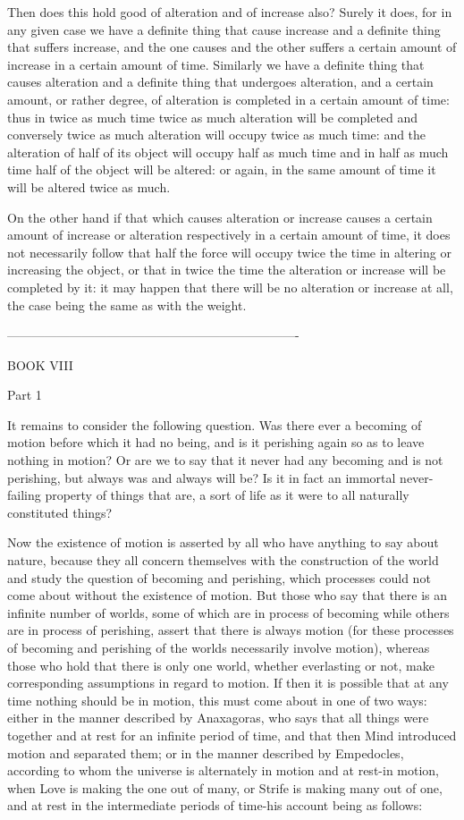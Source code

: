 Then does this hold good of alteration and of increase also? Surely
it does, for in any given case we have a definite thing that cause
increase and a definite thing that suffers increase, and the one causes
and the other suffers a certain amount of increase in a certain amount
of time. Similarly we have a definite thing that causes alteration
and a definite thing that undergoes alteration, and a certain amount,
or rather degree, of alteration is completed in a certain amount of
time: thus in twice as much time twice as much alteration will be
completed and conversely twice as much alteration will occupy twice
as much time: and the alteration of half of its object will occupy
half as much time and in half as much time half of the object will
be altered: or again, in the same amount of time it will be altered
twice as much. 

On the other hand if that which causes alteration or increase causes
a certain amount of increase or alteration respectively in a certain
amount of time, it does not necessarily follow that half the force
will occupy twice the time in altering or increasing the object, or
that in twice the time the alteration or increase will be completed
by it: it may happen that there will be no alteration or increase
at all, the case being the same as with the weight. 

----------------------------------------------------------------------

BOOK VIII

Part 1 

It remains to consider the following question. Was there ever a becoming
of motion before which it had no being, and is it perishing again
so as to leave nothing in motion? Or are we to say that it never had
any becoming and is not perishing, but always was and always will
be? Is it in fact an immortal never-failing property of things that
are, a sort of life as it were to all naturally constituted things?

Now the existence of motion is asserted by all who have anything to
say about nature, because they all concern themselves with the construction
of the world and study the question of becoming and perishing, which
processes could not come about without the existence of motion. But
those who say that there is an infinite number of worlds, some of
which are in process of becoming while others are in process of perishing,
assert that there is always motion (for these processes of becoming
and perishing of the worlds necessarily involve motion), whereas those
who hold that there is only one world, whether everlasting or not,
make corresponding assumptions in regard to motion. If then it is
possible that at any time nothing should be in motion, this must come
about in one of two ways: either in the manner described by Anaxagoras,
who says that all things were together and at rest for an infinite
period of time, and that then Mind introduced motion and separated
them; or in the manner described by Empedocles, according to whom
the universe is alternately in motion and at rest-in motion, when
Love is making the one out of many, or Strife is making many out of
one, and at rest in the intermediate periods of time-his account being
as follows: 

